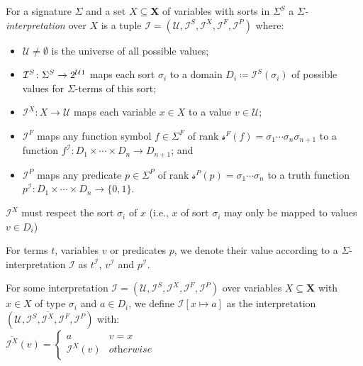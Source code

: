 \begin{definition}
For a signature $\Sigma$ and a set $X\subseteq\mathbf{X}$ of variables with sorts in $\Sigma^S$ a \textit{$\Sigma$-interpretation} over $X$ is a tuple
$\mathcal{I}=\left(\mathcal{U},\mathcal{I}^S, \mathcal{I}^X, \mathcal{I}^F, \mathcal{I}^P\right)$
where:
\begin{itemize}
    \item $\mathcal{U}\neq\emptyset$ is the universe of all possible values;
    \item $\mathcal{I}^S\colon\Sigma^S\to2^\mathcal{U}\footnotemark$ 
        maps each sort $\sigma_i$ to a domain $D_i\coloneqq\mathcal{I}^S\left(\sigma_i\right)$ of possible values for $\Sigma$-terms of this sort;
    \item $\mathcal{I}^X\colon X\to \mathcal{U}$ maps each variable $x\in X$ to a value $v\in\mathcal{U}$;
    \item $\mathcal{I}^F$ maps any function symbol $f\in\Sigma^F$ of rank  $\mathcal{s}^F\left(f\right)=\sigma_1\dotsi\sigma_n\sigma_{n+1}$ to a function $f^\mathcal{I}\colon D_1\times\dotsi\times D_n \to D_{n+1}$; and
    \item $\mathcal{I}^P$ maps any predicate $p\in\Sigma^P$ of rank $\mathcal{s}^P\left(p\right)=\sigma_1\dotsi\sigma_n$ to a truth function $p^\mathcal{I}\colon D_1\times\dotsi\times D_n \to \{0,1\}$.
\end{itemize}
$\mathcal{I}^X$ must respect the sort $\sigma_i$ of $x$ (i.e., $x$ of sort $\sigma_i$ may only be mapped to values $v\in D_i$)
\end{definition}
For terms $t$, variables $v$ or predicates $p$, we denote their value according to a $\Sigma$-interpretation $\mathcal{I}$ as $t^\mathcal{I}$, $v^\mathcal{I}$ and $p^\mathcal{I}$.

\begin{definition}[Substitution]
For some interpretation $\mathcal{I}=\left(\mathcal{U},\mathcal{I}^S, \mathcal{I}^X, \mathcal{I}^F, \mathcal{I}^P\right)$ over variables $X\subseteq\mathbf{X}$ with $x\in X$ of type $\sigma_i$ and $a\in D_i$, we define $\mathcal{I}\left[x\mapsto a\right]$ as the interpretation $\left(\mathcal{U},\mathcal{I}^S, \overline{\mathcal{I}^X}, \mathcal{I}^F, \mathcal{I}^P\right)$ with:\\
$\overline{\mathcal{I}^X}(v)=
\begin{cases}
a & v=x\\
\mathcal{I}^X(v) & \textit{otherwise}
\end{cases}$
\end{definition}

